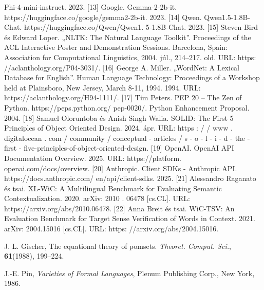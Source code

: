 \documentclass[12pt]{report}
\theoremstyle{definition}
\begin{document}
Phi-4-mini-instruct. 2023.
[13] Google. Gemma-2-2b-it. https://huggingface.co/google/gemma2-2b-it. 2023.
[14] Qwen. Qwen1.5-1.8B-Chat. https://huggingface.co/Qwen/Qwen1.
5-1.8B-Chat. 2023.
[15] Steven Bird és Edward Loper. „NLTK: The Natural Language Toolkit”. Proceedings of the ACL Interactive Poster and Demonstration Sessions. Barcelona, Spain:
Association for Computational Linguistics, 2004. júl., 214–217. old. URL: https:
//aclanthology.org/P04-3031/.
[16] George A. Miller. „WordNet: A Lexical Database for English”. Human Language
Technology: Proceedings of a Workshop held at Plainsboro, New Jersey, March
8-11, 1994. 1994. URL: https://aclanthology.org/H94-1111/.
[17] Tim Peters. PEP 20 – The Zen of Python. https://peps.python.org/
pep-0020/. Python Enhancement Proposal. 2004.
[18] Samuel Oloruntoba és Anish Singh Walia. SOLID: The First 5 Principles of Object
Oriented Design. 2024. ápr. URL: https : / / www . digitalocean . com /
community / conceptual - articles / s - o - l - i - d - the - first -
five-principles-of-object-oriented-design.
[19] OpenAI. OpenAI API Documentation Overview. 2025. URL: https://platform.
openai.com/docs/overview.
[20] Anthropic. Client SDKs - Anthropic API. https://docs.anthropic.com/
en/api/client-sdks. 2025.
[21] Alessandro Raganato és tsai. XL-WiC: A Multilingual Benchmark for Evaluating Semantic Contextualization. 2020. arXiv: 2010 . 06478 [cs.CL]. URL:
https://arxiv.org/abs/2010.06478.
[22] Anna Breit és tsai. WiC-TSV: An Evaluation Benchmark for Target Sense Verification of Words in Context. 2021. arXiv: 2004.15016 [cs.CL]. URL: https:
//arxiv.org/abs/2004.15016.



\begin{thebibliography}{9}





J. L. Gischer,
The equational theory of pomsets.
\emph{Theoret. Comput. Sci.}, \textbf{61}(1988), 199--224.

J.-E. Pin,
\emph{Varieties of Formal Languages},
Plenum Publishing Corp., New York, 1986.





\end{thebibliography}
\end{document}
